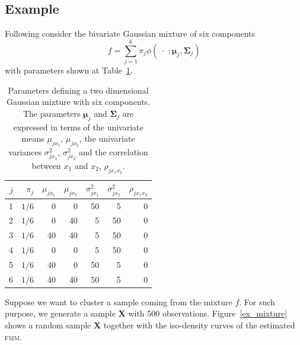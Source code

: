 \documentclass[10pt, a4paper]{article}
\newcommand{\m}[1]{\boldsymbol{#1}}
\newcommand{\fmm}{\textsc{fmm}\xspace}
\begin{document}
\begin{spacing}{1.9}
\subsection{Example} \label{example}

Following \cite{baudry2010combining} consider the bivariate Gaussian mixture of six components
\[
f= \sum_{j=1}^6 \pi_j \phi(\;\cdot\; ;  \m\mu_j, \m\Sigma_j)
\]
with parameters shown at Table~\ref{pars_table}.

\begin{table}[t]
\centering
\begin{tabular}{rrrrrrr}
  \hline
$j$ & $\pi_j$ & $\mu_{j x_1}$ & $\mu_{j x_2}$ & $\sigma^2_{j x_1}$ & $\sigma^2_{j x_2}$ & $\rho_{j x_1 x_2}$ \\ 
  \hline
  1 &  $1/6$ &     0 &     0 &    50 &     5 &     0 \\ 
  2 &  $1/6$  &     0 &    40 &     5 &    50 &     0 \\ 
  3 &  $1/6$  &    40 &    40 &     5 &    50 &     0 \\ 
  4 &  $1/6$  &     0 &     0 &     5 &    50 &     0 \\ 
  5 &  $1/6$  &    40 &     0 &    50 &     5 &     0 \\ 
  6 &  $1/6$  &    40 &    40 &    50 &     5 &     0 \\ 
   \hline
\end{tabular}
\caption{Parameters defining a two dimensional Gaussian mixture with six components. The parameters $\m\mu_j$ and $\m\Sigma_j$ are expressed in terms of the univariate means $\mu_{j x_1}$, $\mu_{j x_2}$, the univariate variances $\sigma^2_{j x_1}$, $\sigma^2_{j x_2}$ and the correlation between $x_1$ and $x_2$, $\rho_{j x_1 x_2}$.}
\label{pars_table}
\end{table}


Suppose we want to cluster a sample coming from the mixture $f$. For such purpose, we generate a sample \textbf{X} with 500 observations. Figure~\ref{ex_mixture} shows a random sample \textbf{X} together with the iso-density curves of the estimated \fmm.


\end{spacing}
\end{document}
